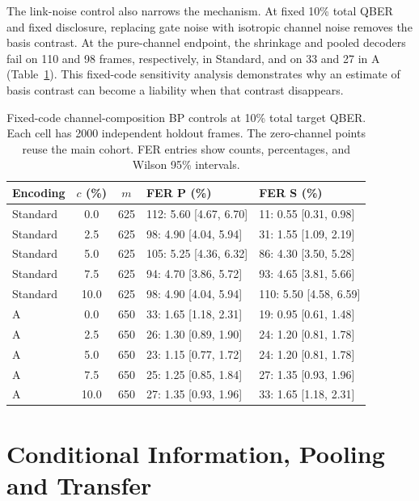 The link-noise control also narrows the mechanism. At fixed 10\% total QBER and
fixed disclosure, replacing gate noise with isotropic channel noise removes the basis
contrast. At the pure-channel endpoint, the shrinkage and pooled decoders fail on 110 and 98 frames, respectively,
in Standard, and on 33 and 27 in A (Table~\ref{tab:channel}). This fixed-code sensitivity analysis demonstrates
why an estimate of basis contrast can become a liability when that contrast disappears.

\begin{table}[!htbp]
\centering
\small\setlength{\tabcolsep}{3.2pt}
\caption{Fixed-code channel-composition BP controls at 10\% total target QBER. Each cell has 2000 independent holdout frames. The zero-channel points reuse the main cohort. FER entries show counts, percentages, and Wilson 95\% intervals.}
\label{tab:channel}
\begin{tabular}{@{}lcc ll@{}}
\toprule
Encoding & $c$ (\%) & $m$ & FER P (\%) & FER S (\%) \\
\midrule
Standard & 0.0 & 625 & 112: 5.60 [4.67, 6.70] & 11: 0.55 [0.31, 0.98] \\
Standard & 2.5 & 625 & 98: 4.90 [4.04, 5.94] & 31: 1.55 [1.09, 2.19] \\
Standard & 5.0 & 625 & 105: 5.25 [4.36, 6.32] & 86: 4.30 [3.50, 5.28] \\
Standard & 7.5 & 625 & 94: 4.70 [3.86, 5.72] & 93: 4.65 [3.81, 5.66] \\
Standard & 10.0 & 625 & 98: 4.90 [4.04, 5.94] & 110: 5.50 [4.58, 6.59] \\
A & 0.0 & 650 & 33: 1.65 [1.18, 2.31] & 19: 0.95 [0.61, 1.48] \\
A & 2.5 & 650 & 26: 1.30 [0.89, 1.90] & 24: 1.20 [0.81, 1.78] \\
A & 5.0 & 650 & 23: 1.15 [0.77, 1.72] & 24: 1.20 [0.81, 1.78] \\
A & 7.5 & 650 & 25: 1.25 [0.85, 1.84] & 27: 1.35 [0.93, 1.96] \\
A & 10.0 & 650 & 27: 1.35 [0.93, 1.96] & 33: 1.65 [1.18, 2.31] \\
\bottomrule
\end{tabular}
\end{table}
\section{Conditional Information, Pooling and Transfer}
\label{app:rule}
